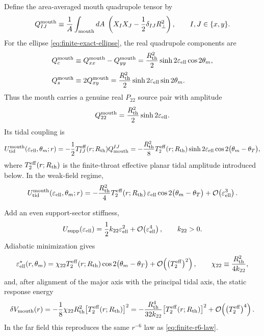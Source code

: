 \documentclass[11pt]{article}
\theoremstyle{plain}
\theoremstyle{definition}
\theoremstyle{remark}
\newcommand{\Ptwotwo}{P_{22}}
\newcommand{\Rth}{R_{\mathrm{th}}}
\newcommand{\epsell}{\varepsilon_{\mathrm{ell}}}
\newcommand{\thmouth}{\theta_m}
\newcommand{\Order}[1]{\mathcal{O}\!\left(#1\right)}
\begin{document}
Define the area-averaged mouth quadrupole tensor by
\begin{equation}
Q_{IJ}^{\rm mouth}
\equiv
\frac1A\int_{\rm mouth}dA\;\left(X_IX_J-\frac12\delta_{IJ}R_\perp^2\right),
\qquad I,J\in\{x,y\}.
\label{eq:finite-mouth-quadrupole-tensor}
\end{equation}
For the ellipse \cref{eq:finite-exact-ellipse}, the real quadrupole components are
\begin{align}
Q_c^{\rm mouth}
&\equiv Q_{xx}^{\rm mouth}-Q_{yy}^{\rm mouth}
=\frac{\Rth^2}{2}\sinh 2\epsell\cos 2\thmouth,
\label{eq:finite-mouth-Qc}
\\[0.5ex]
Q_s^{\rm mouth}
&\equiv 2Q_{xy}^{\rm mouth}
=\frac{\Rth^2}{2}\sinh 2\epsell\sin 2\thmouth.
\label{eq:finite-mouth-Qs}
\end{align}
Thus the mouth carries a genuine real \(\Ptwotwo\) source pair with amplitude
\begin{equation}
Q_{22}^{\rm mouth}=\frac{\Rth^2}{2}\sinh 2\epsell.
\label{eq:finite-mouth-Q22}
\end{equation}
Its tidal coupling is
\begin{equation}
U_{\rm tid}^{\rm mouth}(\epsell,\thmouth;r)
=
-\frac12T_{IJ}^{\rm eff}(r;\Rth)Q_{\rm mouth}^{IJ}
=
-\frac{\Rth^2}{8}T_2^{\rm eff}(r;\Rth)\sinh 2\epsell\cos 2\bigl(\thmouth-\theta_T\bigr),
\label{eq:finite-mouth-energy}
\end{equation}
where $T_2^{\rm eff}(r;\Rth)$ is the finite-throat effective planar tidal amplitude introduced below. In the weak-field regime,
\begin{equation}
U_{\rm tid}^{\rm mouth}(\epsell,\thmouth;r)
=
-\frac{\Rth^2}{4}T_2^{\rm eff}(r;\Rth)\,\epsell\cos 2\bigl(\thmouth-\theta_T\bigr)
+\Order{\epsell^3}.
\label{eq:finite-mouth-energy-weak}
\end{equation}

Add an even support-sector stiffness,
\begin{equation}
U_{\rm supp}(\epsell)=\frac12k_{22}\epsell^2+\Order{\epsell^4},
\qquad k_{22}>0.
\label{eq:finite-mouth-stiffness}
\end{equation}
Adiabatic minimization gives
\begin{equation}
\epsell^{*}(r,\thmouth)
=
\chi_{22}T_2^{\rm eff}(r;\Rth)\cos 2\bigl(\thmouth-\theta_T\bigr)
+\Order{\bigl(T_2^{\rm eff}\bigr)^2},
\qquad
\chi_{22}\equiv \frac{\Rth^2}{4k_{22}},
\label{eq:finite-mouth-ellipticity-response}
\end{equation}
and, after alignment of the major axis with the principal tidal axis, the static response energy
\begin{equation}
\delta V_{\rm mouth}(r)
=
-\frac18\chi_{22}\Rth^2\bigl[T_2^{\rm eff}(r;\Rth)\bigr]^2
=
-\frac{\Rth^4}{32k_{22}}\bigl[T_2^{\rm eff}(r;\Rth)\bigr]^2
+\Order{\bigl(T_2^{\rm eff}\bigr)^4}.
\label{eq:finite-mouth-response-energy}
\end{equation}
In the far field this reproduces the same $r^{-6}$ law as \cref{eq:finite-r6-law}.
\end{document}
